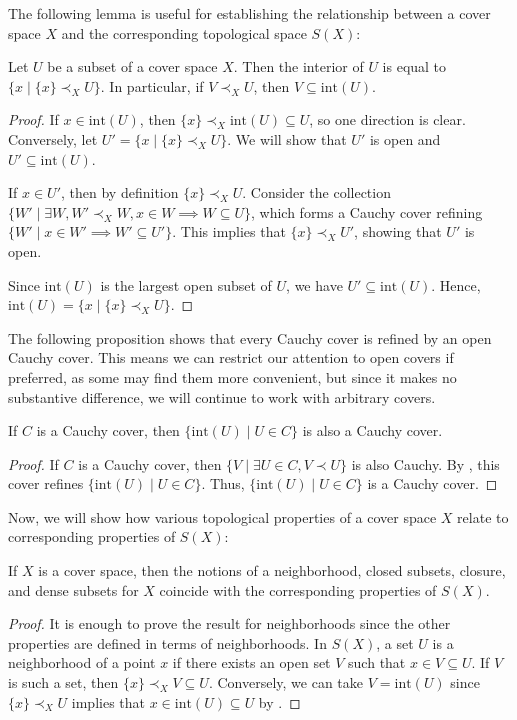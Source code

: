\documentclass[pdflatex,sn-mathphys-num]{sn-jnl}
\theoremstyle{definition}
\theoremstyle{remark}
\numberwithin{figure}{section}
\newcommand{\rb}{\prec}
\begin{document}
The following lemma is useful for establishing the relationship between a cover space $X$ and the corresponding topological space $S(X)$:

\begin{lem}
Let $U$ be a subset of a cover space $X$.
Then the interior of $U$ is equal to $\{ x \mid \{ x \} \rb_X U \}$.
In particular, if $V \rb_X U$, then $V \subseteq \mathrm{int}(U)$.
\end{lem}
\begin{proof}
If $x \in \mathrm{int}(U)$, then $\{ x \} \rb_X \mathrm{int}(U) \subseteq U$, so one direction is clear.
Conversely, let $U' = \{ x \mid \{ x \} \rb_X U \}$.
We will show that $U'$ is open and $U' \subseteq \mathrm{int}(U)$.

If $x \in U'$, then by definition $\{ x \} \rb_X U$.
Consider the collection $\{ W' \mid \exists W, W' \rb_X W, x \in W \implies W \subseteq U \}$, which forms a Cauchy cover refining $\{ W' \mid x \in W' \implies W' \subseteq U' \}$.
This implies that $\{ x \} \rb_X U'$, showing that $U'$ is open.

Since $\mathrm{int}(U)$ is the largest open subset of $U$, we have $U' \subseteq \mathrm{int}(U)$. Hence, $\mathrm{int}(U) = \{ x \mid \{ x \} \rb_X U \}$.
\end{proof}

The following proposition shows that every Cauchy cover is refined by an open Cauchy cover.
This means we can restrict our attention to open covers if preferred, as some may find them more convenient,
but since it makes no substantive difference, we will continue to work with arbitrary covers.

\begin{prop}
If $C$ is a Cauchy cover, then $\{ \mathrm{int}(U) \mid U \in C \}$ is also a Cauchy cover.
\end{prop}
\begin{proof}
If $C$ is a Cauchy cover, then $\{ V \mid \exists U \in C, V \rb U \}$ is also Cauchy.
By , this cover refines $\{ \mathrm{int}(U) \mid U \in C \}$.
Thus, $\{ \mathrm{int}(U) \mid U \in C \}$ is a Cauchy cover.
\end{proof}

Now, we will show how various topological properties of a cover space $X$ relate to corresponding properties of $S(X)$:

\begin{prop}
If $X$ is a cover space, then the notions of a neighborhood, closed subsets, closure, and dense subsets for $X$ coincide with the corresponding properties of $S(X)$.
\end{prop}
\begin{proof}
It is enough to prove the result for neighborhoods since the other properties are defined in terms of neighborhoods.
In $S(X)$, a set $U$ is a neighborhood of a point $x$ if there exists an open set $V$ such that $x \in V \subseteq U$.
If $V$ is such a set, then $\{ x \} \rb_X V \subseteq U$.
Conversely, we can take $V = \mathrm{int}(U)$ since $\{ x \} \rb_X U$ implies that $x \in \mathrm{int}(U) \subseteq U$ by .
\end{proof}
\end{document}
